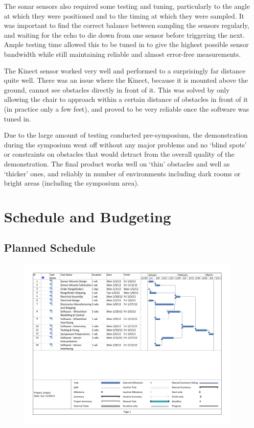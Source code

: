 \documentclass[oneside,final,a4paper]{report}
\begin{document}
The sonar sensors also required some testing and tuning, particularly to the angle at which they were positioned and to the timing at which they were sampled. It was important to find the correct balance between sampling the sensors regularly, and waiting for the echo to die down from one sensor before triggering the next. Ample testing time allowed this to be tuned in to give the highest possible sensor bandwidth while still maintaining reliable and almost error-free measurements.

The Kinect sensor worked very well and performed to a surprisingly far distance quite well. There was an issue where the Kinect, because it is mounted above the ground, cannot see obstacles directly in front of it. This was solved by only allowing the chair to approach within a certain distance of obstacles in front of it (in practice only a few feet), and proved to be very reliable once the software was tuned in.

Due to the large amount of testing conducted pre-symposium, the demonstration during the symposium went off without any major problems and no `blind spots' or constraints on obstacles that would detract from the overall quality of the demonstration. The final product works well on `thin' obstacles and well as `thicker' ones, and reliably in number of environments including dark rooms or bright areas (including the symposium area).

\chapter{Schedule and Budgeting}

\section{Planned Schedule}
\begin{figure}
 \centering
 \includegraphics[scale=0.6]{gantt} \label{fig:gantt}
\end{figure}
\end{document}
